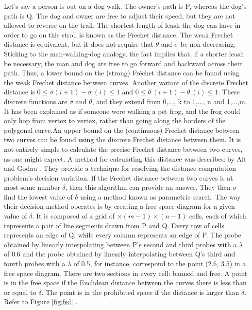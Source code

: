 Let's say a person is out on a dog walk. The owner's path is P, whereas the dog's path is Q. The dog and owner are free to adjust their speed, but they are not allowed to reverse on the trail. The shortest length of leash the dog can have in order to go on this stroll is known as the Frechet distance. The weak Frechet distance is equivalent, but it does not require that $\theta$ and $\sigma$ be non-decreasing. Sticking to the man-walking-dog analogy, the fact implies that, if a shorter leash be necessary, the man and dog are free to go forward and backward across their path. Thus, a lower bound on the (strong) Fréchet distance can be found using the weak Frechet distance between curves. Another variant of the discrete Frechet distance is $0 \leq \sigma (i+1)-\sigma \ (i) \leq 1$ and $0 \leq \theta \ (i + 1)-\theta \ (i) \leq 1$. These discrete functions are $\sigma $ and $\theta $, and they extend from {0,..., k} to {1,..., n} and {1,...,m}. It has been explained as if someone were walking a pet frog, and the frog could only hop from vertex to vertex, rather than going along the borders of the polygonal curve.An upper bound on the (continuous) Frechet distance between two curves can be found using the discrete Frechet distance between them. It is not entirely simple to calculate the precise Frechet distance between two curves, as one might expect.  A method for calculating this distance was described by Alt and Godau \cite{AltGodau}. They provide a technique for resolving the distance computation problem's decision variation. If the Frechet distance between two curves is at most some number $ \delta $, then this algorithm can provide an answer. They then $ \sigma $ find the lowest value of $ \delta $ using a method known as parametric search. The way their decision method operates is by creating a free space diagram for a given value of $\delta $. It is composed of a grid of $ \times (m - 1) \times (n - 1)$ cells, each of which represents a pair of line segments drawn from P and Q. Every row of cells represents an edge of Q, while every column represents an edge of P. The probe obtained by linearly interpolating between P's second and third probes with a $\lambda$ of 0.6 and the probe obtained by linearly interpolating between Q's third and fourth probes with a $\lambda$ of 0.5, for instance, correspond to the point (2.6, 3.5) in a free space diagram. There are two sections in every cell: banned and free. A point is in the free space if the Euclidean distance between the curves there is less than or equal to $ \delta $. The point is in the prohibited space if the distance is larger than $\delta$. Refer to Figure \ref{fig:fsd} .


